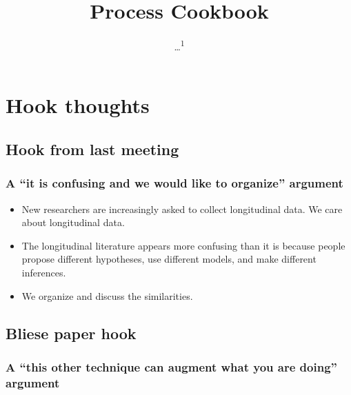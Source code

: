 \documentclass[english,,man]{apa6}
\title{Process Cookbook}
\author{\ldots{}\textsuperscript{1}}
\date{}
\affiliation{
\vspace{0.5cm}
\textsuperscript{1} ...}
\providecommand{\tightlist}{%
  \setlength{\itemsep}{0pt}\setlength{\parskip}{0pt}}
\theoremstyle{definition}
\theoremstyle{definition}
\theoremstyle{definition}
\theoremstyle{remark}
\begin{document}
\maketitle

\hypertarget{hook-thoughts}{%
\section{Hook thoughts}\label{hook-thoughts}}

\hypertarget{hook-from-last-meeting}{%
\subsection{Hook from last meeting}\label{hook-from-last-meeting}}

\hypertarget{a-it-is-confusing-and-we-would-like-to-organize-argument}{%
\subsubsection{\texorpdfstring{A \enquote{it is confusing and we would
like to organize}
argument}{A ``it is confusing and we would like to organize'' argument}}\label{a-it-is-confusing-and-we-would-like-to-organize-argument}}

\begin{itemize}
\tightlist
\item
  New researchers are increasingly asked to collect longitudinal data.
  We care about longitudinal data.
\item
  The longitudinal literature appears more confusing than it is because
  people propose different hypotheses, use different models, and make
  different inferences.
\item
  We organize and discuss the similarities.
\end{itemize}

\hypertarget{bliese-paper-hook}{%
\subsection{Bliese paper hook}\label{bliese-paper-hook}}

\hypertarget{a-this-other-technique-can-augment-what-you-are-doing-argument}{%
\subsubsection{\texorpdfstring{A \enquote{this other technique can
augment what you are doing}
argument}{A ``this other technique can augment what you are doing'' argument}}\label{a-this-other-technique-can-augment-what-you-are-doing-argument}}
\end{document}
